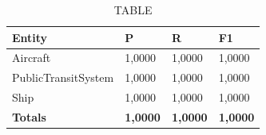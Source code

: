 \documentclass[thesis=M,english]{FITthesis}[2018/05/30]
\begin{document}
	\begin{table}[H]\centering
		\caption{TABLE}
		\label{}
		\begin{tabular}{|l|l|l|l|}
			\hline {\textbf{Entity}} & {\textbf{P}} & {\textbf{R}} & {\textbf{F1}}\\\hline
				Aircraft & 1,0000 & 1,0000 & 1,0000\\
				PublicTransitSystem & 1,0000 & 1,0000 & 1,0000\\
				Ship & 1,0000 & 1,0000 & 1,0000\\\hline
				\textbf{Totals} & \textbf{1,0000} & \textbf{1,0000} & \textbf{1,0000}\\\hline
		\end{tabular}
	\end{table}
	

\end{document}
